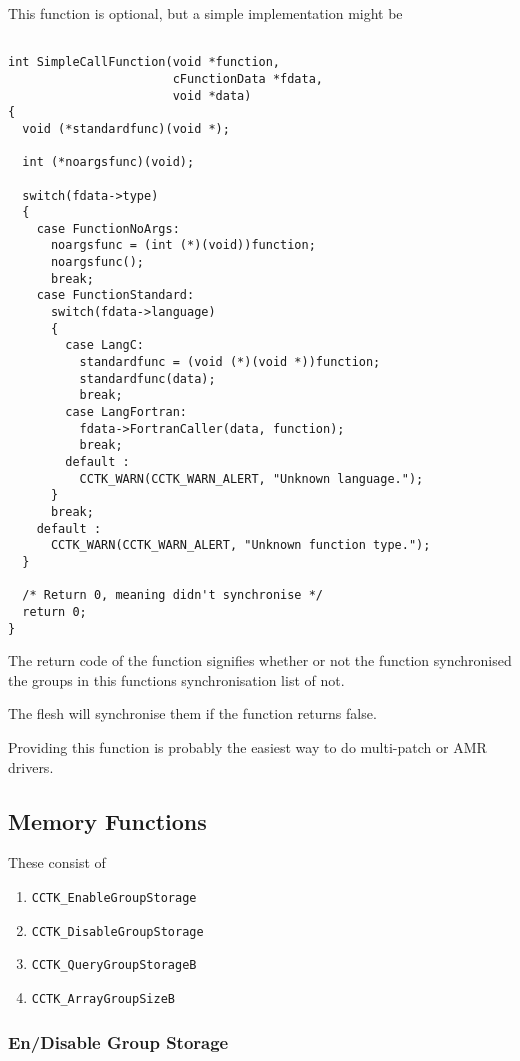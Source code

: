 This function is optional, but a simple implementation might be

\begin{verbatim}

int SimpleCallFunction(void *function,
                       cFunctionData *fdata,
                       void *data)
{
  void (*standardfunc)(void *);

  int (*noargsfunc)(void);

  switch(fdata->type)
  {
    case FunctionNoArgs:
      noargsfunc = (int (*)(void))function;
      noargsfunc();
      break;
    case FunctionStandard:
      switch(fdata->language)
      {
        case LangC:
          standardfunc = (void (*)(void *))function;
          standardfunc(data);
          break;
        case LangFortran:
          fdata->FortranCaller(data, function);
          break;
        default :
          CCTK_WARN(CCTK_WARN_ALERT, "Unknown language.");
      }
      break;
    default :
      CCTK_WARN(CCTK_WARN_ALERT, "Unknown function type.");
  }

  /* Return 0, meaning didn't synchronise */
  return 0;
}

\end{verbatim}

The return code of the function signifies whether or not the function
synchronised the groups in this functions synchronisation list of not.

The flesh will synchronise them if the function returns false.

Providing this function is probably the easiest way to do multi-patch or
AMR drivers.

\subsection{Memory Functions}

These consist of
\begin{enumerate}
\item{} {\tt CCTK\_EnableGroupStorage}
\item{} {\tt CCTK\_DisableGroupStorage}
\item{} {\tt CCTK\_QueryGroupStorageB}
\item{} {\tt CCTK\_ArrayGroupSizeB}
\end{enumerate}

\subsubsection{En/Disable Group Storage}

